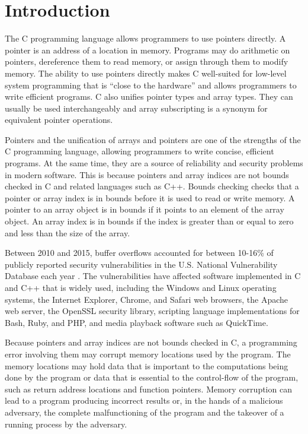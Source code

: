
\chapter{Introduction}
\label{chapter:introduction}

The C programming language \cite{Ritchie1988, ISO2011} allows programmers to use
pointers directly. A pointer is an address of a location in memory. Programs may do
arithmetic on pointers, dereference them to read memory, or assign
through them to modify memory. The ability to use pointers directly
makes C well-suited for low-level system programming that is ``close to
the hardware'' and allows programmers to write efficient programs. C
also unifies pointer types and array types. They can usually be used
interchangeably and array subscripting is a synonym for equivalent
pointer operations.

Pointers and the unification of arrays and pointers are one of the
strengths of the C programming language, allowing programmers to write
concise, efficient programs. At the same time, they are a source of
reliability and security problems in modern software. This is
because pointers and array indices are not bounds checked in C and
related languages such as C++. Bounds checking checks that a pointer or
array index is in bounds before it is used to read or write memory. A
pointer to an array object is in bounds if it points to an element of
the array object. An array index is in bounds if the index is greater
than or equal to zero and less than the size of the array.

Between 2010 and 2015, buffer overflows accounted for between 10-16\% of
publicly reported security vulnerabilities in the U.S. National
Vulnerability Database each year \cite{NIST2015}. The vulnerabilities have affected
software implemented in C and C++ that is widely used, including the
Windows and Linux operating systems, the Internet Explorer, Chrome, and
Safari web browsers, the Apache web server, the OpenSSL security
library, scripting language implementations for Bash, Ruby, and PHP, and
media playback software such as QuickTime.

Because pointers and array indices are not bounds checked in C, a
programming error involving them may corrupt memory locations used by
the program. The memory locations may hold data that is important to the
computations being done by the program or data that is essential to the
control-flow of the program, such as return address locations and
function pointers. Memory corruption can lead to a program producing
incorrect results or, in the hands of a malicious adversary, the
complete malfunctioning of the program and the takeover of a running
process by the adversary.

